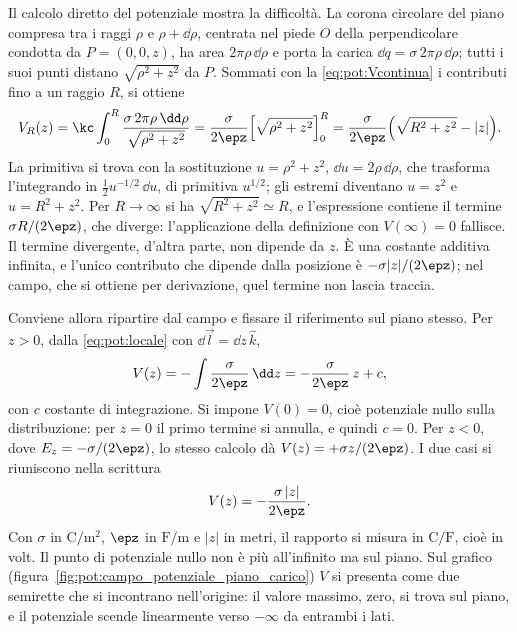 \documentclass[main.tex]{subfiles}
\begin{document}
	Il calcolo diretto del potenziale mostra la difficoltà. La corona circolare del piano compresa tra i raggi $\rho$ e $\rho+\dd\rho$, centrata nel piede $O$ della perpendicolare condotta da $P=(0,0,z)$, ha area $2\pi\rho\,\dd\rho$ e porta la carica $\dd q=\sigma\,2\pi\rho\,\dd\rho$; tutti i suoi punti distano $\sqrt{\rho^2+z^2}$ da $P$. Sommati con la \eqref{eq:pot:Vcontinua} i contributi fino a un raggio $R$, si ottiene
	\[
	V_R(z)=\kc\int_0^{R}\frac{\sigma\,2\pi\rho\,\dd\rho}{\sqrt{\rho^2+z^2}}=\frac{\sigma}{2\epz}\Big[\sqrt{\rho^2+z^2}\Big]_0^R=\frac{\sigma}{2\epz}\Big(\sqrt{R^2+z^2}-|z|\Big).
	\]
	La primitiva si trova con la sostituzione $u=\rho^2+z^2$, $\dd u=2\rho\,\dd\rho$, che trasforma l'integrando in $\tfrac12u^{-1/2}\,\dd u$, di primitiva $u^{1/2}$; gli estremi diventano $u=z^2$ e $u=R^2+z^2$. Per $R\to\infty$ si ha $\sqrt{R^2+z^2}\simeq R$, e l'espressione contiene il termine $\sigma R/(2\epz)$, che diverge: l'applicazione della definizione con $V(\infty)=0$ fallisce. Il termine divergente, d'altra parte, non dipende da $z$. È una costante additiva infinita, e l'unico contributo che dipende dalla posizione è $-\sigma|z|/(2\epz)$; nel campo, che si ottiene per derivazione, quel termine non lascia traccia.
	
	Conviene allora ripartire dal campo e fissare il riferimento sul piano stesso. Per $z>0$, dalla \eqref{eq:pot:locale} con $\dd\vec l=\dd z\,\hat k$,
	\[
	V(z)=-\int\frac{\sigma}{2\epz}\,\dd z=-\frac{\sigma}{2\epz}\,z+c ,
	\]
	con $c$ costante di integrazione. Si impone $V(0)=0$, cioè potenziale nullo sulla distribuzione: per $z=0$ il primo termine si annulla, e quindi $c=0$. Per $z<0$, dove $E_z=-\sigma/(2\epz)$, lo stesso calcolo dà $V(z)=+\sigma z/(2\epz)$. I due casi si riuniscono nella scrittura
	\begin{equation}\label{eq:pot:Vpiano}
		V(z)=-\frac{\sigma\,|z|}{2\epz}.
	\end{equation}
	Con $\sigma$ in $\mathrm{C/m^2}$, $\epz$ in $\mathrm{F/m}$ e $|z|$ in metri, il rapporto si misura in $\mathrm{C/F}$, cioè in volt. Il punto di potenziale nullo non è più all'infinito ma sul piano. Sul grafico (figura~\ref{fig:pot:campo_potenziale_piano_carico}) $V$ si presenta come due semirette che si incontrano nell'origine: il valore massimo, zero, si trova sul piano, e il potenziale scende linearmente verso $-\infty$ da entrambi i lati.
	
\end{document}
